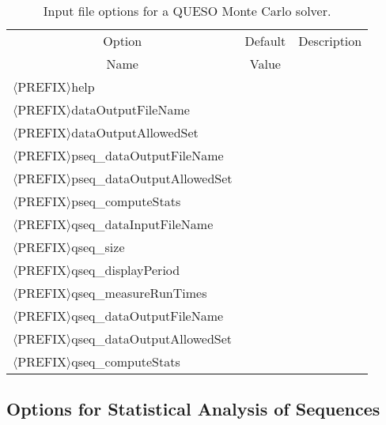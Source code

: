 \begin{table}[!h]
\begin{center}
\begin{tabular}{|l|c|c|}
\hline
\multicolumn{1}{|c|}{Option}                        & Default & Description \\
\multicolumn{1}{|c|}{Name}                          & Value   &             \\
\hline
\hline
$\langle$PREFIX$\rangle$help                        &         &             \\
\hline
$\langle$PREFIX$\rangle$dataOutputFileName          &         &             \\
\hline
$\langle$PREFIX$\rangle$dataOutputAllowedSet        &         &             \\
\hline
$\langle$PREFIX$\rangle$pseq\_dataOutputFileName     &         &             \\
\hline
$\langle$PREFIX$\rangle$pseq\_dataOutputAllowedSet   &         &             \\
\hline
$\langle$PREFIX$\rangle$pseq\_computeStats           &         &             \\
\hline
$\langle$PREFIX$\rangle$qseq\_dataInputFileName      &         &             \\
\hline
$\langle$PREFIX$\rangle$qseq\_size                   &         &             \\
\hline
$\langle$PREFIX$\rangle$qseq\_displayPeriod          &         &             \\
\hline
$\langle$PREFIX$\rangle$qseq\_measureRunTimes        &         &             \\
\hline
$\langle$PREFIX$\rangle$qseq\_dataOutputFileName     &         &             \\
\hline
$\langle$PREFIX$\rangle$qseq\_dataOutputAllowedSet   &         &             \\
\hline
$\langle$PREFIX$\rangle$qseq\_computeStats           &         &             \\
\hline
\end{tabular}
\end{center}
\caption{
Input file options for a QUESO Monte Carlo solver.
}
\label{tab-monte-carlo-options}
\end{table}

\clearpage
\subsection{Options for Statistical Analysis of Sequences}

